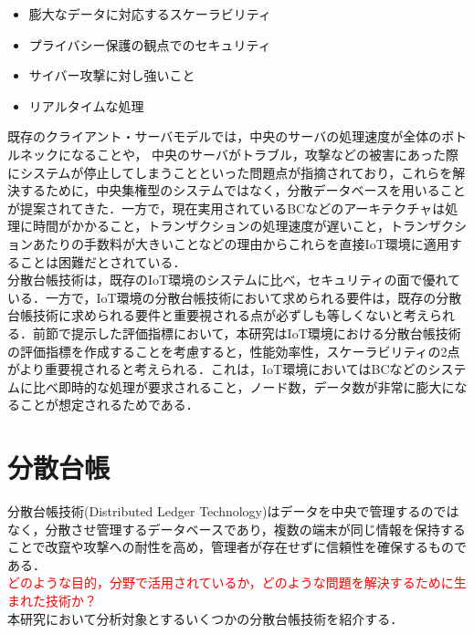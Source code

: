 \documentclass[japanese, macos]{KU2}
\begin{document}
\begin{itemize}
\item 膨大なデータに対応するスケーラビリティ
\item プライバシー保護の観点でのセキュリティ
\item サイバー攻撃に対し強いこと
\item リアルタイムな処理
\end{itemize}

既存のクライアント・サーバモデルでは，中央のサーバの処理速度が全体のボトルネックになることや，
中央のサーバがトラブル，攻撃などの被害にあった際にシステムが停止してしまうことといった問題点が指摘されており，これらを解決するために，中央集権型のシステムではなく，分散データベースを用いることが提案されてきた．一方で，現在実用されているBCなどのアーキテクチャは処理に時間がかかること，トランザクションの処理速度が遅いこと，トランザクションあたりの手数料が大きいことなどの理由からこれらを直接IoT環境に適用することは困難だとされている．\\
分散台帳技術は，既存のIoT環境のシステムに比べ，セキュリティの面で優れている．一方で，IoT環境の分散台帳技術において求められる要件は，既存の分散台帳技術に求められる要件と重要視される点が必ずしも等しくないと考えられる．前節で提示した評価指標において，本研究はIoT環境における分散台帳技術の評価指標を作成することを考慮すると，性能効率性，スケーラビリティの2点がより重要視されると考えられる．これは，IoT環境においてはBCなどのシステムに比べ即時的な処理が要求されること，ノード数，データ数が非常に膨大になることが想定されるためである．\\

\section{分散台帳}
分散台帳技術(Distributed Ledger Technology)はデータを中央で管理するのではなく，分散させ管理するデータベースであり，複数の端末が同じ情報を保持することで改竄や攻撃への耐性を高め，管理者が存在せずに信頼性を確保するものである．\\
\textcolor{red}{どのような目的，分野で活用されているか，どのような問題を解決するために生まれた技術か？}\\
本研究において分析対象とするいくつかの分散台帳技術を紹介する．
\end{document}
